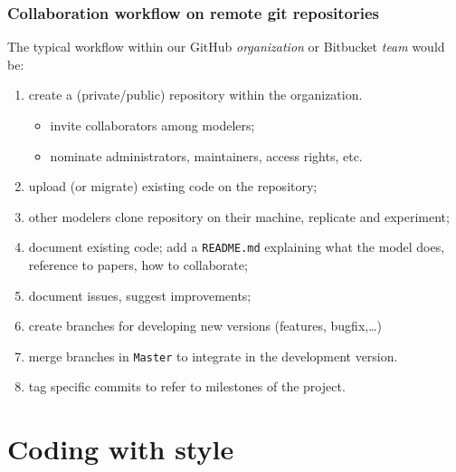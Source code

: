 \documentclass[10pt,svgnames,handout]{beamer}
\begin{document}
\begin{frame}
\frametitle{Collaboration workflow on remote git repositories}
The typical workflow within our GitHub \emph{organization} or Bitbucket \emph{team} would be:
\begin{enumerate}[<+->]
  \item create a (private/public) repository within the organization.
  \begin{itemize}
    \item invite collaborators among modelers;
    \item nominate administrators, maintainers, access rights, etc.
  \end{itemize}
  \item upload (or migrate) existing code on the repository;
  \item other modelers clone repository on their machine, replicate and experiment;
  \item document existing code; add a \texttt{README.md} explaining what the model does, reference to papers, how to collaborate;
  \item document issues, suggest improvements;
  \item create branches for developing new versions (features, bugfix,\ldots)
  \item merge branches in \texttt{Master} to integrate in the development version.
  \item tag specific commits to refer to milestones of the project.
\end{enumerate}

\end{frame}



\section{Coding with style}
\end{document}
